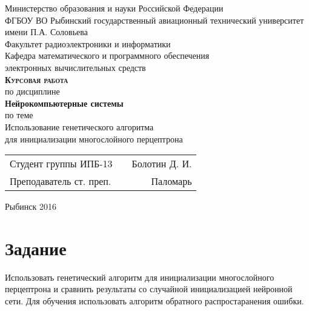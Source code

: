\documentclass[a4paper,12pt]{article}
\begin{document}
\begin{titlepage}
\newpage


\begin{center}
	\large		
   	Министерство образования и науки Российской Федерации\\[0.5cm]
    	
	ФГБОУ ВО Рыбинский государственный авиационный технический университет имени П.А. Соловьева\\[1.0cm]

	Факультет радиоэлектроники и информатики\\[0.25cm]
		
	Кафедра математического и программного обеспечения\\ электронных вычислительных средств\\[1.5cm]
	
	\Large
	\textbf{\textsc{Курсовая работа}}\\[0.25cm]
	по  дисциплине\\
	\textbf{Нейрокомпьютерные системы}\\[0.5cm]
	
	по теме\\
	Использование генетического алгоритма \\для инициализации многослойного перцептрона
	
\end{center}

\vfill	
\begin{tabularx}{0.95\textwidth}{lXr}
Студент группы ИПБ-13 			& &	Болотин Д. И.\\

Преподаватель ст. преп.			& & Паломарь\\
\end{tabularx}

\vspace{1.5cm}
\center Рыбинск 2016
\end{titlepage}	


\newpage
\setcounter{page}{2}

\tableofcontents

\newpage\section*{Задание}
Использовать генетический алгоритм для инициализации многослойного перцептрона и сравнить результаты со случайной инициализацией нейронной сети. Для обучения использовать алгоритм обратного распростаранения ошибки.
\end{document}
